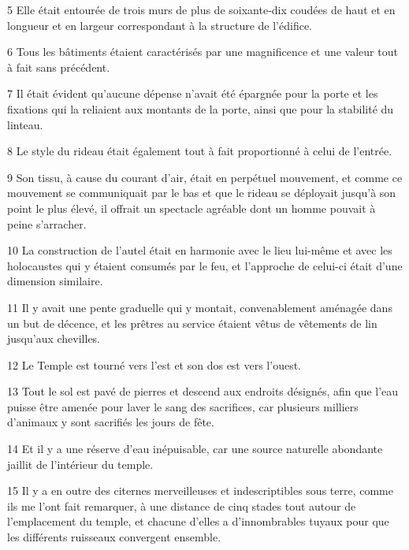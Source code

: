 \par 5 Elle était entourée de trois murs de plus de soixante-dix coudées de haut et en longueur et en largeur correspondant à la structure de l'édifice.

\par 6 Tous les bâtiments étaient caractérisés par une magnificence et une valeur tout à fait sans précédent.

\par 7 Il était évident qu'aucune dépense n'avait été épargnée pour la porte et les fixations qui la reliaient aux montants de la porte, ainsi que pour la stabilité du linteau.

\par 8 Le style du rideau était également tout à fait proportionné à celui de l'entrée.

\par 9 Son tissu, à cause du courant d'air, était en perpétuel mouvement, et comme ce mouvement se communiquait par le bas et que le rideau se déployait jusqu'à son point le plus élevé, il offrait un spectacle agréable dont un homme pouvait à peine s'arracher.

\par 10 La construction de l'autel était en harmonie avec le lieu lui-même et avec les holocaustes qui y étaient consumés par le feu, et l'approche de celui-ci était d'une dimension similaire.

\par 11 Il y avait une pente graduelle qui y montait, convenablement aménagée dans un but de décence, et les prêtres au service étaient vêtus de vêtements de lin jusqu'aux chevilles.

\par 12 Le Temple est tourné vers l'est et son dos est vers l'ouest.

\par 13 Tout le sol est pavé de pierres et descend aux endroits désignés, afin que l'eau puisse être amenée pour laver le sang des sacrifices, car plusieurs milliers d'animaux y sont sacrifiés les jours de fête.

\par 14 Et il y a une réserve d'eau inépuisable, car une source naturelle abondante jaillit de l'intérieur du temple.

\par 15 Il y a en outre des citernes merveilleuses et indescriptibles sous terre, comme ils me l'ont fait remarquer, à une distance de cinq stades tout autour de l'emplacement du temple, et chacune d'elles a d'innombrables tuyaux pour que les différents ruisseaux convergent ensemble.

